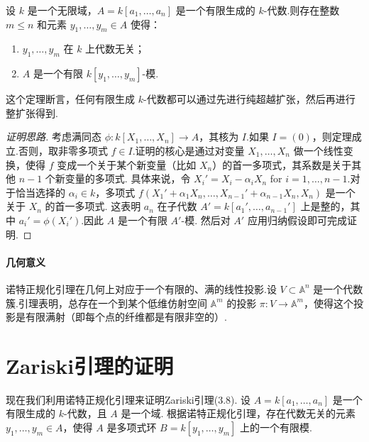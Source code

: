 \begin{theorem}[诺特正规化引理]
设 \(k\) 是一个无限域，\(A = k\left\lbrack  {{a}_{1},\ldots ,{a}_{n}}\right\rbrack\) 是一个有限生成的 \(k\)-代数.则存在整数 \(m \leq  n\) 和元素 \({y}_{1},\ldots ,{y}_{m} \in  A\) 使得：
\begin{enumerate}
    \item \({y}_{1},\ldots ,{y}_{m}\) 在 \(k\) 上代数无关；
    \item \(A\) 是一个有限 \(k\left\lbrack  {{y}_{1},\ldots ,{y}_{m}}\right\rbrack\)-模.
\end{enumerate}
\end{theorem}

这个定理断言，任何有限生成 \(k\)-代数都可以通过先进行纯超越扩张，然后再进行整扩张得到.

\begin{proof}[证明思路]
考虑满同态 \(\phi: k\left\lbrack  {{X}_{1},\ldots ,{X}_{n}}\right\rbrack   \rightarrow  A\)，其核为 \(I\).如果 \(I=(0)\)，则定理成立.否则，取非零多项式 \(f \in I\).证明的核心是通过对变量 \({X}_{1},\ldots ,{X}_{n}\) 做一个线性变换，使得 \(f\) 变成一个关于某个新变量（比如 \(X_n\)）的首一多项式，其系数是关于其他 \(n-1\) 个新变量的多项式.
具体来说，令 \({X}_{i}' = {X}_{i} - {\alpha }_{i}{X}_{n}\) for \(i=1, \ldots, n-1\).对于恰当选择的 \({\alpha }_{i} \in  k\)，多项式 \(f(X_1'+\alpha_1 X_n, \ldots, X_{n-1}'+\alpha_{n-1}X_n, X_n)\) 是一个关于 \(X_n\) 的首一多项式.
这表明 \(a_n\) 在子代数 \(A' = k[a_1', \ldots, a_{n-1}']\) 上是整的，其中 \(a_i' = \phi(X_i')\).因此 \(A\) 是一个有限 \(A'\)-模.
然后对 \(A'\) 应用归纳假设即可完成证明.
\end{proof}

\paragraph{几何意义} 诺特正规化引理在几何上对应于一个有限的、满的线性投影.设 \(V \subset {\mathbb{A}}^n\) 是一个代数簇.引理表明，总存在一个到某个低维仿射空间 \({\mathbb{A}}^m\) 的投影 \(\pi: V \to {\mathbb{A}}^m\)，使得这个投影是有限满射（即每个点的纤维都是有限非空的）.

\section{Zariski引理的证明}

现在我们利用诺特正规化引理来证明Zariski引理(3.8).
设 \(A = k\left\lbrack  {{a}_{1},\ldots ,{a}_{n}}\right\rbrack\) 是一个有限生成的 \(k\)-代数，且 \(A\) 是一个域.
根据诺特正规化引理，存在代数无关的元素 \({y}_{1},\ldots ,{y}_{m} \in  A\)，使得 \(A\) 是多项式环 \(B = k\left\lbrack  {{y}_{1},\ldots ,{y}_{m}}\right\rbrack\) 上的一个有限模.

